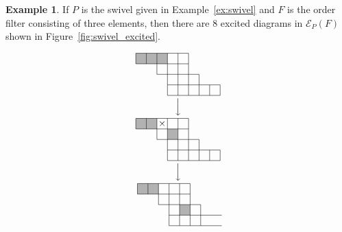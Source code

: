 \documentclass[10pt]{amsart}
\theoremstyle{definition}
\newtheorem{exam}[theo]{Example}
\theoremstyle{remark}
\newcommand\EE{\mathcal{E}}
\begin{document}
\begin{exam}
\label{ex:swivel_excited}
If $P$ is the swivel given in Example~\ref{ex:swivel} and $F$ is the order filter consisting of three elements, 
then there are $8$ excited diagrams in $\EE_P(F)$ shown in Figure~\ref{fig:swivel_excited}.
\begin{figure}[!htb]
$$
\setlength{\unitlength}{1.1pt}
\begin{CD}
\raisebox{-20pt}{
\begin{picture}(80,40)
\fboxsep=0mm
\put(0,30){\colorbox[gray]{0.7}{\makebox(10,10){}}}
\put(10,30){\colorbox[gray]{0.7}{\makebox(10,10){}}}
\put(20,30){\colorbox[gray]{0.7}{\makebox(10,10){}}}
\put(0,40){\line(1,0){50}}
\put(0,30){\line(1,0){50}}
\put(20,20){\line(1,0){40}}
\put(30,10){\line(1,0){50}}
\put(30,0){\line(1,0){50}}
\put(0,30){\line(0,1){10}}
\put(10,30){\line(0,1){10}}
\put(20,20){\line(0,1){20}}
\put(30,0){\line(0,1){40}}
\put(40,0){\line(0,1){40}}
\put(50,0){\line(0,1){40}}
\put(60,0){\line(0,1){20}}
\put(70,0){\line(0,1){10}}
\put(80,0){\line(0,1){10}}
\end{picture}
}
\\
@VVV
\\
\raisebox{-20pt}{
\begin{picture}(80,40)
\fboxsep=0mm
\put(0,30){\colorbox[gray]{0.7}{\makebox(10,10){}}}
\put(10,30){\colorbox[gray]{0.7}{\makebox(10,10){}}}
\put(30,20){\colorbox[gray]{0.7}{\makebox(10,10){}}}
\put(0,40){\line(1,0){50}}
\put(0,30){\line(1,0){50}}
\put(20,20){\line(1,0){40}}
\put(30,10){\line(1,0){50}}
\put(30,0){\line(1,0){50}}
\put(0,30){\line(0,1){10}}
\put(10,30){\line(0,1){10}}
\put(20,20){\line(0,1){20}}
\put(30,0){\line(0,1){40}}
\put(40,0){\line(0,1){40}}
\put(50,0){\line(0,1){40}}
\put(60,0){\line(0,1){20}}
\put(70,0){\line(0,1){10}}
\put(80,0){\line(0,1){10}}
\put(20,30){\makebox(10,10){$\times$}}
\end{picture}
}
\\
@VVV
\\
\raisebox{-20pt}{
\begin{picture}(80,40)
\fboxsep=0mm
\put(0,30){\colorbox[gray]{0.7}{\makebox(10,10){}}}
\put(10,30){\colorbox[gray]{0.7}{\makebox(10,10){}}}
\put(40,10){\colorbox[gray]{0.7}{\makebox(10,10){}}}
\put(0,40){\line(1,0){50}}
\put(0,30){\line(1,0){50}}
\put(20,20){\line(1,0){40}}
\put(30,10){\line(1,0){50}}
\put(30,0){\line(1,0){50}}
\put(0,30){\line(0,1){10}}
\put(10,30){\line(0,1){10}}
\put(20,20){\line(0,1){20}}
\put(30,0){\line(0,1){40}}
\put(40,0){\line(0,1){40}}
\put(50,0){\line(0,1){40}}
\put(60,0){\line(0,1){20}}

\end{picture}}
\end{CD}$$
\end{figure}
\end{exam}
\end{document}
